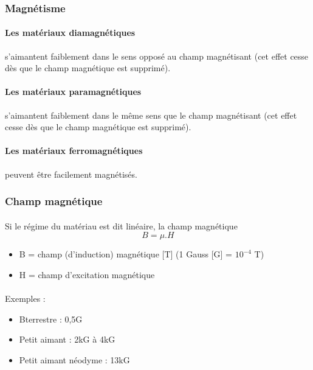\documentclass{article}
\begin{document}
\subsubsection{Magnétisme}
\paragraph{Les matériaux diamagnétiques} s'aimantent faiblement dans le sens opposé au champ magnétisant (cet effet cesse dès que le champ magnétique est supprimé).

\paragraph{Les matériaux paramagnétiques} s'aimantent faiblement dans le même sens que le champ magnétisant (cet effet cesse dès que le champ magnétique est supprimé).

\paragraph{Les matériaux ferromagnétiques} peuvent être facilement magnétisés.

\subsubsection{Champ magnétique}
\paragraph{}
Si le régime du matériau est dit linéaire, la champ magnétique $$B = \mu . H$$
\begin{itemize}
    \item B = champ (d'induction) magnétique [\si{\tesla}] (1 Gauss [G] = $10^{-4}$ \si{\tesla})
    \item H = champ d'excitation magnétique
\end{itemize}

\paragraph{}Exemples :
\begin{itemize}
    \item Bterrestre : 0,5G
    \item Petit aimant : 2kG à 4kG
    \item Petit aimant néodyme : 13kG
\end{itemize}
\end{document}

